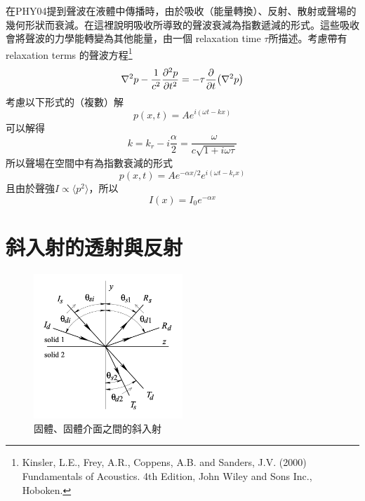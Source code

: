 \documentclass[12pt]{report}
\begin{document}
在PHY04提到聲波在液體中傳播時，由於吸收（能量轉換）、反射、散射或聲場的幾何形狀而衰減。在這裡說明吸收所導致的聲波衰減為指數遞減的形式。這些吸收會將聲波的力學能轉變為其他能量，由一個 relaxation time $\tau$所描述。考慮帶有 relaxation terms 的聲波方程\footnote{Kinsler, L.E., Frey, A.R., Coppens, A.B. and Sanders, J.V. (2000) Fundamentals of Acoustics. 4th Edition, John Wiley and Sons Inc., Hoboken.}
\begin{equation}
    \nabla^2 p - \frac{1}{c^2} \pdv[2]{p}{t} =-\tau\pdv{t}(\nabla^2 p)
\end{equation}
考慮以下形式的（複數）解
\begin{equation}
    p(x,t)=A e^{i(\omega t -kx)}
\end{equation}
可以解得
\begin{equation}
    k=k_r-i\frac{\alpha}{2}=\frac{\omega}{c\sqrt{1+i\omega\tau}}
\end{equation}
所以聲場在空間中有為指數衰減的形式
\begin{equation}
    p(x,t)=Ae^{-\alpha x/2}e^{i(\omega t - k_r x)}
\end{equation}
且由於聲強$I\propto \langle p^2 \rangle$，所以
\begin{equation}
    I(x)=I_0 e^{-\alpha x}
\end{equation}

\section{斜入射的透射與反射}

\begin{figure}[htbp]
    \centering
    \includegraphics[width=0.5\textwidth]{oblique.png}
    \caption{固體、固體介面之間的斜入射}
    \label{oblique}
\end{figure}
\end{document}
